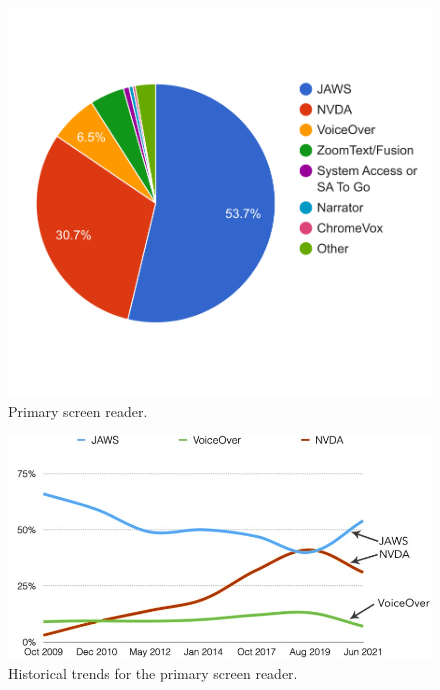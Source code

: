 \begin{figure}[tp]
\centering
\includegraphics[keepaspectratio,width=\linewidth,height=\halfh]
{images/screen-readers-piechart.pdf}

\caption[Primary screen reader]{
Primary screen reader.
}
\label{fig:screen-readers-piechart}
\end{figure}

\begin{figure}[tp]
\centering
\includegraphics[keepaspectratio,width=\linewidth,height=\halfh]
{images/screen-readers-line.jpg}

\caption[Historical trends for primary screen reader]{
Historical trends for the primary screen reader.
}
\label{fig:screen-readers-line}
\end{figure}





